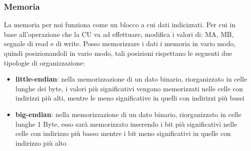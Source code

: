 \subsubsection{Memoria}
La memoria per noi funziona come un blocco a cui dati indicizzati. Per cui in base all'operazione che la CU va ad effettuare, modifica i valori di: MA, MB, segnale di read e di write.
Posso memorizzare i dati i memoria in vario modo, quindi posizionandoli in vario modo, tali posizioni rispettano le seguenti due tipologie di organizzazione:
\begin{itemize}
    \item \textbf{little-endian}: nella memorizzazione di un dato binario, riorganizzato in celle lunghe dei byte, i valori più significativi vengono memorizzati nelle celle con indirizzi più alti, mentre le meno significative in quelli con indirizzi più bassi
    \item \textbf{big-endian}: nella memorizzazione di un dato binario, riorganizzato in celle lunghe 1 Byte, esso sarà memorizzato inserendo i bit più significativi nelle celle con indirizzo più basso mentre i bit meno significativi in quelle con indirizzo più alto
\end{itemize}

